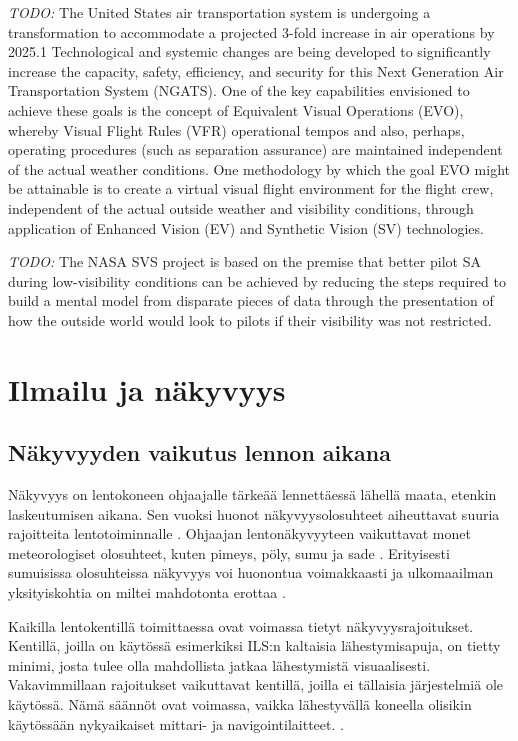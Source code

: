 \documentclass[utf8,bachelor,manualbib]{gradu3}
\begin{document}
\emph{TODO:}
The United States air transportation system is undergoing a transformation to accommodate a projected 3-fold
increase in air operations by 2025.1 Technological and systemic changes are being developed to significantly
increase the capacity, safety, efficiency, and security for this Next Generation Air Transportation System
(NGATS). One of the key capabilities envisioned to achieve these goals is the concept of Equivalent Visual
Operations (EVO), whereby Visual Flight Rules (VFR) operational tempos and also, perhaps, operating
procedures (such as separation assurance) are maintained independent of the actual weather conditions. One
methodology by which the goal EVO might be attainable is to create a virtual visual flight environment for
the flight crew, independent of the actual outside weather and visibility conditions, through application of
Enhanced Vision (EV) and Synthetic Vision (SV) technologies. \citep{baileyym2007}

\emph{TODO:}
The NASA SVS project is based on the premise that better pilot SA during
low-visibility conditions can be achieved by reducing the steps required to build a
mental model from disparate pieces of data through the presentation of how the
outside world would look to pilots if their visibility was not restricted. \citep{prinzel2004}

\chapter{Ilmailu ja näkyvyys}

\section{Näkyvyyden vaikutus lennon aikana}

Näkyvyys on lentokoneen ohjaajalle tärkeää lennettäessä lähellä maata, etenkin laskeutumisen aikana. Sen vuoksi huonot näkyvyysolosuhteet aiheuttavat suuria rajoitteita lentotoiminnalle \citep{mollersachs1994}. Ohjaajan lentonäkyvyyteen vaikuttavat monet meteorologiset olosuhteet, kuten pimeys, pöly, sumu ja sade \citep{wickens2009}. Erityisesti sumuisissa olosuhteissa näkyvyys voi huonontua voimakkaasti ja ulkomaailman yksityiskohtia on miltei mahdotonta erottaa \citep{beiergemperlein2004}.

Kaikilla lentokentillä toimittaessa ovat voimassa tietyt näkyvyysrajoitukset. Kentillä, joilla on käytössä esimerkiksi ILS:n kaltaisia lähestymisapuja, on tietty minimi, josta tulee olla mahdollista jatkaa lähestymistä visuaalisesti. Vakavimmillaan rajoitukset vaikuttavat kentillä, joilla ei tällaisia järjestelmiä ole käytössä. Nämä säännöt ovat voimassa, vaikka lähestyvällä koneella olisikin käytössään nykyaikaiset mittari- ja navigointilaitteet. \cite{mollersachs1994}.
\end{document}
